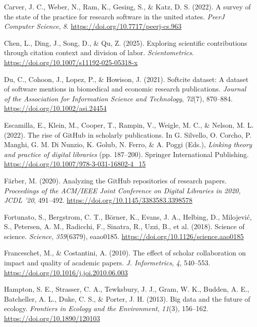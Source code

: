 \documentclass[
  number,
  3p,
  onecolumn]{elsarticle}
\newlength{\cslhangindent}
\newenvironment{CSLReferences}[2] %
 {\begin{list}{}{%
  \setlength{\itemindent}{0pt}
  \setlength{\leftmargin}{0pt}
  \setlength{\parsep}{0pt}
  \ifodd #1
   \setlength{\leftmargin}{\cslhangindent}
   \setlength{\itemindent}{-1\cslhangindent}
  \fi
  \setlength{\itemsep}{#2\baselineskip}}}
 {\end{list}}
\begin{document}
\begin{CSLReferences}{1}{0}
Carver, J. C., Weber, N., Ram, K., Gesing, S., \& Katz, D. S. (2022). A
survey of the state of the practice for research software in the united
states. \emph{PeerJ Computer Science}, \emph{8}.
\url{https://doi.org/10.7717/peerj-cs.963}

Chen, L., Ding, J., Song, D., \& Qu, Z. (2025). Exploring scientific
contributions through citation context and division of labor.
\emph{Scientometrics}. \url{https://doi.org/10.1007/s11192-025-05318-x}

Du, C., Cohoon, J., Lopez, P., \& Howison, J. (2021). Softcite dataset:
A dataset of software mentions in biomedical and economic research
publications. \emph{Journal of the Association for Information Science
and Technology}, \emph{72}(7), 870--884.
\url{https://doi.org/10.1002/asi.24454}

Escamilla, E., Klein, M., Cooper, T., Rampin, V., Weigle, M. C., \&
Nelson, M. L. (2022). The rise of GitHub in scholarly publications. In
G. Silvello, O. Corcho, P. Manghi, G. M. Di Nunzio, K. Golub, N. Ferro,
\& A. Poggi (Eds.), \emph{Linking theory and practice of digital
libraries} (pp. 187--200). Springer International Publishing.
\url{https://doi.org/10.1007/978-3-031-16802-4_15}

Färber, M. (2020). Analyzing the GitHub repositories of research papers.
\emph{Proceedings of the ACM/IEEE Joint Conference on Digital Libraries
in 2020, JCDL '20}, 491--492.
\url{https://doi.org/10.1145/3383583.3398578}

Fortunato, S., Bergstrom, C. T., Börner, K., Evans, J. A., Helbing, D.,
Milojević, S., Petersen, A. M., Radicchi, F., Sinatra, R., Uzzi, B., et
al. (2018). Science of science. \emph{Science}, \emph{359}(6379),
eaao0185. \url{https://doi.org/10.1126/science.aao0185}

Franceschet, M., \& Costantini, A. (2010). The effect of scholar
collaboration on impact and quality of academic papers. \emph{J.
Informetrics}, \emph{4}, 540--553.
\url{https://doi.org/10.1016/j.joi.2010.06.003}

Hampton, S. E., Strasser, C. A., Tewksbury, J. J., Gram, W. K., Budden,
A. E., Batcheller, A. L., Duke, C. S., \& Porter, J. H. (2013). Big data
and the future of ecology. \emph{Frontiers in Ecology and the
Environment}, \emph{11}(3), 156--162.
\url{https://doi.org/10.1890/120103}


\end{CSLReferences}
\end{document}
